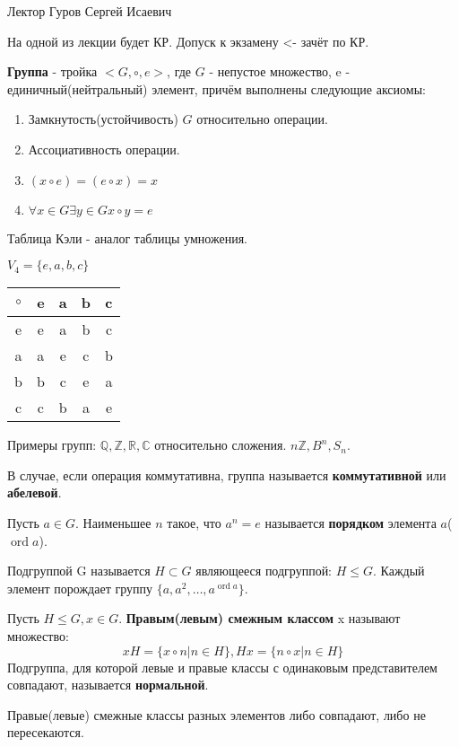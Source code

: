 \documentclass[11pt]{article}
\author{Sergey Makarov}
\date{\today}
\title{}
\def\zall{\setcounter{lem}{0}\setcounter{cnsqnc}{0}\setcounter{th}{0}\setcounter{Cmt}{0}\setcounter{equation}{0}}
\newcounter{lem}\setcounter{lem}{0}
\newcounter{th}\setcounter{th}{0}
\def\th{\par\smallskip\refstepcounter{th}\textbf{\arabic{th}}}
\newtheorem*{Theorem}{Теорема \th}
\newcounter{cnsqnc}\setcounter{cnsqnc}{0}
\newcounter{Cmt}\setcounter{Cmt}{0}
\begin{document}
\zall

Лектор Гуров Сергей Исаевич

На одной из лекции будет КР. Допуск к экзамену <- зачёт по КР.

\textbf{Группа} - тройка \(<G, \circ, e>\), где \(G\) - непустое множество, e - единичный(нейтральный) элемент, причём выполнены следующие аксиомы:
\begin{enumerate}
\item Замкнутость(устойчивость) \(G\) относительно операции.
\item Ассоциативность операции.
\item \((x \circ e) = (e \circ x) = x\)
\item \(\forall x \in G \exists y \in G x \circ y = e\)
\end{enumerate}
Таблица Кэли - аналог таблицы умножения.

\(V_4 = \{e, a, b, c\}\)

\begin{tabular}{|c|c|c|c|c|}
\hline
$\circ$  & e & a & b & c \\
\hline
e        & e & a & b & c \\
\hline
a        & a & e & c & b \\
\hline
b        & b & c & e & a \\
\hline
c        & c & b & a & e \\
\hline
\end{tabular}

Примеры групп: \(\mathbb{Q}, \mathbb{Z}, \mathbb{R}, \mathbb{C}\) относительно сложения.
\(n\mathbb{Z}, B^n, S_n\).

В случае, если операция коммутативна, группа называется \textbf{коммутативной} или \textbf{абелевой}.

Пусть \(a \in G\). Наименьшее \(n\) такое, что \(a^n = e\) называется \textbf{порядком} элемента \(a\)(\(\operatorname{ord} a\)).

Подгруппой G называется \(H \subset G\) являющееся подгруппой: \(H \leq G\).
Каждый элемент порождает группу \(\{a, a^2, \ldots, a^{\operatorname{ord} a}\}\).

Пусть \(H \leq G, x \in G\). \textbf{Правым(левым) смежным классом} x называют множество:
$$xH = \{x \circ n | n \in H\}, Hx = \{n \circ x | n \in H\}$$
Подгруппа, для которой левые и правые классы с одинаковым представителем совпадают, называется
\textbf{нормальной}.

\begin{Theorem}
Правые(левые) смежные классы разных элементов либо совпадают, либо не пересекаются.
\end{Theorem}
\end{document}
